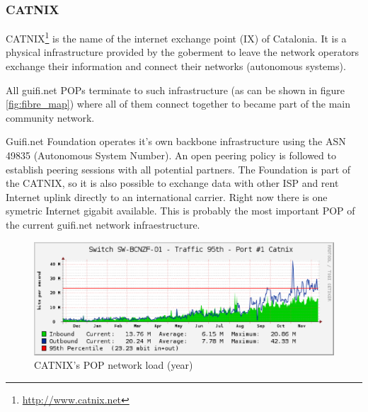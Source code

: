 \subsubsection{CATNIX}

\bigskip 

CATNIX\footnote{\url{http://www.catnix.net}} is the name of the internet exchange point (IX) of Catalonia. 
It is a physical infrastructure provided by the goberment to leave the network operators exchange their 
information and connect their networks (autonomous systems). 

\medskip
All guifi.net POPs terminate to such infrastructure (as can be shown in figure \ref{fig:fibre_map}) where
all of them connect together to became part of the main community network. 

\medskip
Guifi.net Foundation operates it's own backbone infrastructure using the ASN 49835 (Autonomous System Number). 
An open peering policy is followed to establish peering sessions with all potential partners.
The Foundation is part of the CATNIX, so it is also possible to exchange data with other ISP and
rent Internet uplink directly to an international carrier. Right now there is one symetric Internet gigabit 
available. 
\newline
This is probably the most important POP of the current guifi.net network infraestructure.


\begin{figure}[htbp]
  \centering
  \includegraphics[scale=.65]{sect3/figures/catnix_network_load_year.eps} 
  \caption{CATNIX's POP network load (year)}
  \label{fig:vic_net_load}
\end{figure}


